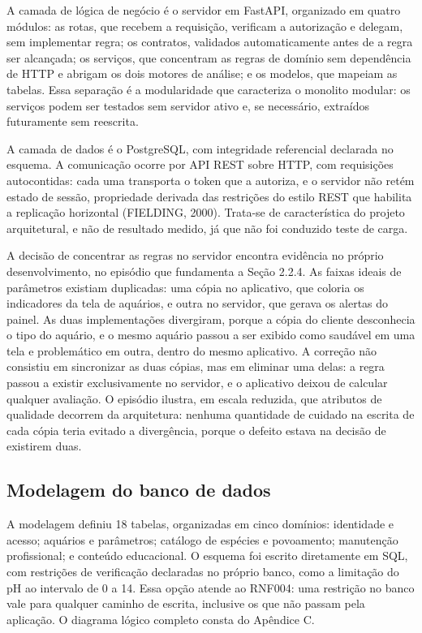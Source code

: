 \documentclass[12pt,oneside,a4paper,brazilian]{abntex2}
\begin{document}
A camada de lógica de negócio é o servidor em FastAPI, organizado em quatro módulos: as rotas, que recebem a requisição, verificam a autorização e delegam, sem implementar regra; os contratos, validados automaticamente antes de a regra ser alcançada; os serviços, que concentram as regras de domínio sem dependência de HTTP e abrigam os dois motores de análise; e os modelos, que mapeiam as tabelas. Essa separação é a modularidade que caracteriza o monolito modular: os serviços podem ser testados sem servidor ativo e, se necessário, extraídos futuramente sem reescrita.

A camada de dados é o PostgreSQL, com integridade referencial declarada no esquema. A comunicação ocorre por API REST sobre HTTP, com requisições autocontidas: cada uma transporta o token que a autoriza, e o servidor não retém estado de sessão, propriedade derivada das restrições do estilo REST que habilita a replicação horizontal (FIELDING, 2000). Trata-se de característica do projeto arquitetural, e não de resultado medido, já que não foi conduzido teste de carga.

A decisão de concentrar as regras no servidor encontra evidência no próprio desenvolvimento, no episódio que fundamenta a Seção 2.2.4. As faixas ideais de parâmetros existiam duplicadas: uma cópia no aplicativo, que coloria os indicadores da tela de aquários, e outra no servidor, que gerava os alertas do painel. As duas implementações divergiram, porque a cópia do cliente desconhecia o tipo do aquário, e o mesmo aquário passou a ser exibido como saudável em uma tela e problemático em outra, dentro do mesmo aplicativo. A correção não consistiu em sincronizar as duas cópias, mas em eliminar uma delas: a regra passou a existir exclusivamente no servidor, e o aplicativo deixou de calcular qualquer avaliação. O episódio ilustra, em escala reduzida, que atributos de qualidade decorrem da arquitetura: nenhuma quantidade de cuidado na escrita de cada cópia teria evitado a divergência, porque o defeito estava na decisão de existirem duas.


\subsection{Modelagem do banco de dados}
A modelagem definiu 18 tabelas, organizadas em cinco domínios: identidade e acesso; aquários e parâmetros; catálogo de espécies e povoamento; manutenção profissional; e conteúdo educacional. O esquema foi escrito diretamente em SQL, com restrições de verificação declaradas no próprio banco, como a limitação do pH ao intervalo de 0 a 14. Essa opção atende ao RNF004: uma restrição no banco vale para qualquer caminho de escrita, inclusive os que não passam pela aplicação. O diagrama lógico completo consta do Apêndice C.
\end{document}
